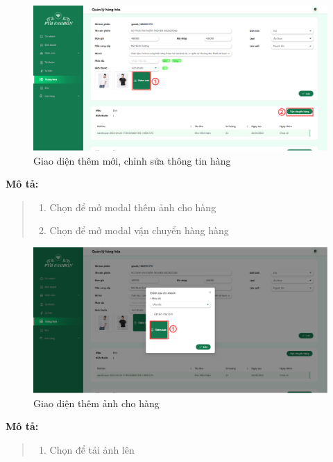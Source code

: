 \begin{figure}[!htp]
    \centering
    \includegraphics[width=12cm]{img/UI/admin_implement/goodsEdit.png}
    \newline
    \caption{Giao diện thêm mới, chỉnh sửa thông tin hàng}
\end{figure}
\textbf{Mô tả:}
\begin{quote}
    \begin{enumerate}
        \item Chọn để mở modal thêm ảnh cho hàng
        \item Chọn để mở modal vận chuyển hàng hàng
    \end{enumerate}
\end{quote}

\begin{figure}[!htp]
    \centering
    \includegraphics[width=12cm]{img/UI/admin_implement/goodsImage.png}
    \newline
    \caption{Giao diện thêm ảnh cho hàng}
\end{figure}
\textbf{Mô tả:}
\begin{quote}
    \begin{enumerate}
        \item Chọn để tải ảnh lên
    \end{enumerate}
\end{quote}

